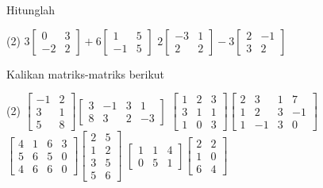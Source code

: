 \begin{exercise}
Hitunglah
\begin{tasks}(2)
\task
$3\begin{bmatrix}
0 & 3 \\
-2 & 2
\end{bmatrix}
+
6
\begin{bmatrix}
1 & 5 \\
-1 & 5
\end{bmatrix}$
\task
$2\begin{bmatrix}
-3 & 1 \\
2 & 2
\end{bmatrix}
-
3
\begin{bmatrix}
2 & -1 \\
3 & 2
\end{bmatrix}$
\end{tasks}
\end{exercise}

\begin{exercise}
Kalikan matriks-matriks berikut
\begin{tasks}(2)
\task
$\begin{bmatrix}
-1 & 2 \\
3 & 1 \\
5 & 8
\end{bmatrix}
\begin{bmatrix}
3 & -1 & 3 & 1 \\
8 & 3 & 2 & -3
\end{bmatrix}$
\task
$\begin{bmatrix}
1 & 2 & 3 \\
3 & 1 & 1 \\
1 & 0 & 3
\end{bmatrix}
\begin{bmatrix}
2 & 3 & 1 & 7 \\
1 & 2 & 3 & -1 \\
1 & -1 & 3 & 0
\end{bmatrix}$
\task
$\begin{bmatrix}
4 & 1 & 6 & 3 \\
5 & 6 & 5 & 0 \\
4 & 6 & 6 & 0
\end{bmatrix}
\begin{bmatrix}
2 & 5 \\
1 & 2 \\
3 & 5 \\
5 & 6
\end{bmatrix}$
\task
$\begin{bmatrix}
1 & 1 & 4 \\
0 & 5 & 1
\end{bmatrix}
\begin{bmatrix}
2 & 2 \\
1 & 0 \\
6 & 4
\end{bmatrix}$
\end{tasks}
\end{exercise}

